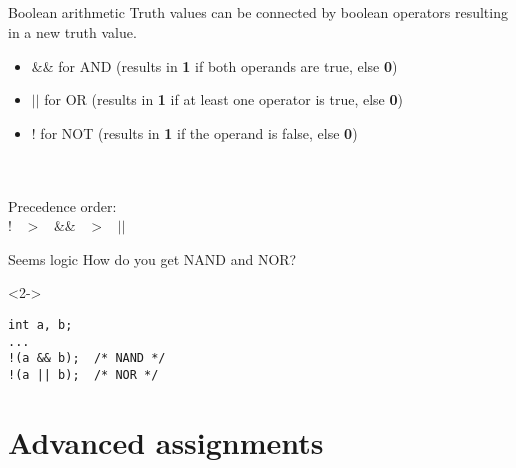 \subsection{}
\begin{frame}{Boolean arithmetic}
	Truth values can be connected by boolean operators resulting in a new truth value.
	\begin{itemize}
		\item \&\& for AND (results in \textbf{1} if both operands are true, else \textbf{0})
		\item $||$ for OR (results in \textbf{1} if at least one operator is true, else \textbf{0})
		\item ! for NOT (results in \textbf{1} if the operand is false, else \textbf{0})
	\end{itemize}
	\ \\\ \\Precedence order:\\
	\centering
	! \ $>$ \ \&\& \ $>$ \ $||$ 
\end{frame}
\begin{frame}[fragile]{Seems logic}
	How do you get NAND and NOR?
	\begin{uncoverenv}<2->
		\begin{lstlisting}[numbers=none]
int a, b;
...
!(a && b);	/* NAND */
!(a || b);	/* NOR */
\end{lstlisting}
	\end{uncoverenv}
\end{frame}
\section{Advanced assignments}
